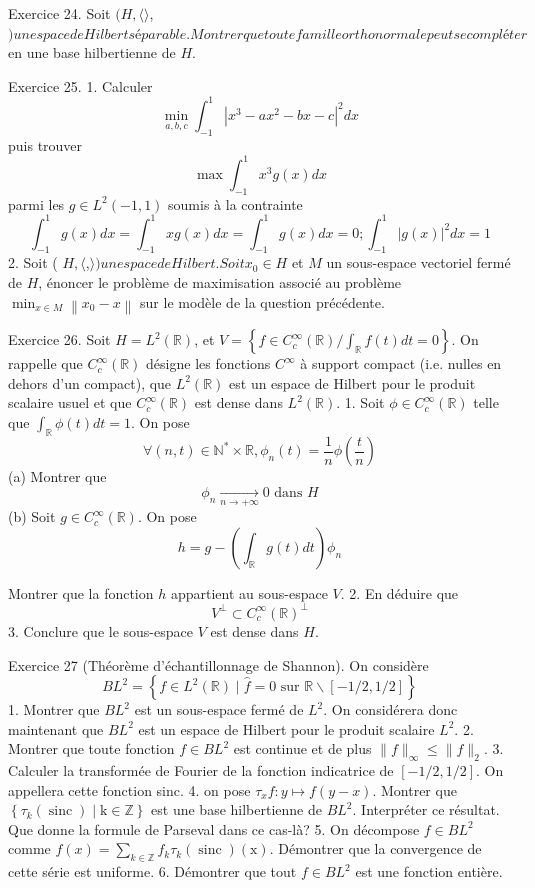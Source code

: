\documentclass[12pt,a4paper]{article}
\begin{document}
Exercice 24. Soit \((H,\langle\rangle\),\() un espace de Hilbert séparable. Montrer que toute famille orthonormale peut se compléter\) en une base hilbertienne de \(H\).

Exercice 25. 1. Calculer
\[
\min _{a, b, c} \int_{-1}^{1}\left|x^{3}-a x^{2}-b x-c\right|^{2} d x
\]
puis trouver
\[
\max \int_{-1}^{1} x^{3} g(x) d x
\]
parmi les \(g \in L^{2}(-1,1)\) soumis à la contrainte
\[
\int_{-1}^{1} g(x) d x=\int_{-1}^{1} x g(x) d x=\int_{-1}^{1} g(x) d x=0 ; \int_{-1}^{1}|g(x)|^{2} d x=1
\]
2. Soit ( \(H,\langle\),\(\rangle ) un espace de Hilbert. Soit x_{0} \in H\) et \(M\) un sous-espace vectoriel fermé de \(H\), énoncer le problème de maximisation associé au problème \(\min _{x \in M}\left\|x_{0}-x\right\|\) sur le modèle de la question précédente.

Exercice 26. Soit \(H=L^{2}(\mathbb{R})\), et \(V=\left\{f \in C_{c}^{\infty}(\mathbb{R}) / \int_{\mathbb{R}} f(t) d t=0\right\}\).
On rappelle que \(C_{c}^{\infty}(\mathbb{R})\) désigne les fonctions \(C^{\infty}\) à support compact (i.e. nulles en dehors d'un compact), que \(L^{2}(\mathbb{R})\) est un espace de Hilbert pour le produit scalaire usuel et que \(C_{c}^{\infty}(\mathbb{R})\) est dense dans \(L^{2}(\mathbb{R})\).
1. Soit \(\phi \in C_{c}^{\infty}(\mathbb{R})\) telle que \(\int_{\mathbb{R}} \phi(t) d t=1\). On pose
\[
\forall(n, t) \in \mathbb{N}^{*} \times \mathbb{R}, \phi_{n}(t)=\frac{1}{n} \phi\left(\frac{t}{n}\right)
\]
(a) Montrer que
\[
\phi_{n} \underset{n \rightarrow+\infty}{\rightarrow} 0 \text { dans } H
\]
(b) Soit \(g \in C_{c}^{\infty}(\mathbb{R})\). On pose
\[
h=g-\left(\int_{\mathbb{R}} g(t) d t\right) \phi_{n}
\]

Montrer que la fonction \(h\) appartient au sous-espace \(V\).
2. En déduire que
\[
V^{\perp} \subset C_{c}^{\infty}(\mathbb{R})^{\perp}
\]
3. Conclure que le sous-espace \(V\) est dense dans \(H\).

Exercice 27 (Théorème d'échantillonnage de Shannon). On considère
\[
B L^{2}=\left\{f \in L^{2}(\mathbb{R}) \mid \widehat{f}=0 \text { sur } \mathbb{R} \backslash[-1 / 2,1 / 2]\right\}
\]
1. Montrer que \(B L^{2}\) est un sous-espace fermé de \(L^{2}\). On considérera donc maintenant que \(B L^{2}\) est un espace de Hilbert pour le produit scalaire \(L^{2}\).
2. Montrer que toute fonction \(f \in B L^{2}\) est continue et de plus \(\|f\|_{\infty} \leqslant\|f\|_{2}\).
3. Calculer la transformée de Fourier de la fonction indicatrice de \([-1 / 2,1 / 2]\). On appellera cette fonction sinc.
4. on pose \(\tau_{x} f: y \mapsto f(y-x)\). Montrer que \(\left\{\tau_{k}(\operatorname{sinc}) \mid \mathrm{k} \in \mathbb{Z}\right\}\) est une base hilbertienne de \(B L^{2}\). Interpréter ce résultat. Que donne la formule de Parseval dans ce cas-là?
5. On décompose \(f \in B L^{2}\) comme \(f(x)=\sum_{k \in \mathbb{Z}} f_{k} \tau_{k}(\operatorname{sinc})(\mathrm{x})\). Démontrer que la convergence de cette série est uniforme.
6. Démontrer que tout \(f \in B L^{2}\) est une fonction entière.
\end{document}
